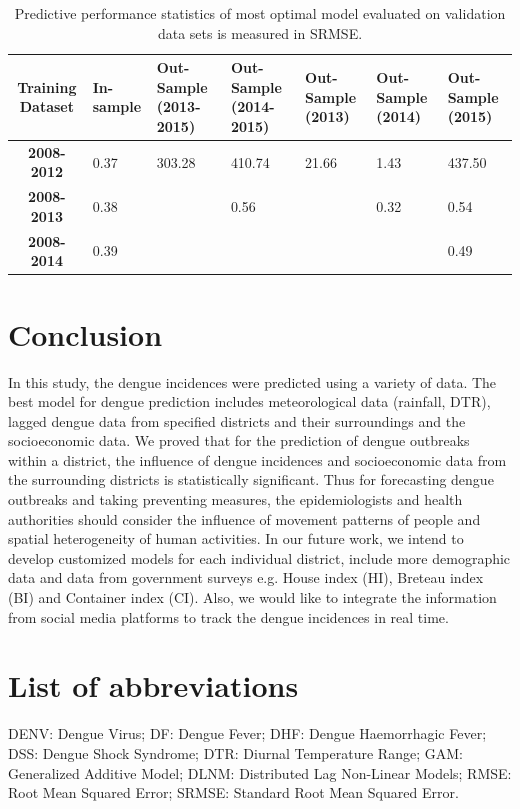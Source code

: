 \documentclass{bmcart}
\begin{document}
\begin{table}[H]
	\centering
	\begin{tabular}{|cp{1.5cm}p{1.5cm}p{1.5cm}p{1.5cm}p{1.5cm}p{1.5cm}|}
		\hline
		\textbf{Training Dataset} & \textbf{In-sample} & \textbf{Out-Sample} (2013-2015) & \textbf{Out-Sample} (2014-2015) & \textbf{Out-Sample} (2013) &\textbf{Out-Sample} (2014) & \textbf{Out-Sample} (2015) \\ 
		\hline
		\textbf{2008-2012} & 0.37 & 303.28 & 410.74 & 21.66 & 1.43 & 437.50 \\ 
		\textbf{2008-2013} & 0.38 &  & 0.56 &  & 0.32 & 0.54 \\ 
		\textbf{2008-2014} & 0.39 &  &  &  &  & 0.49 \\ 
		\hline
	\end{tabular}
	\caption{Predictive performance statistics of most optimal model evaluated on validation data sets is measured in SRMSE.}
	\label{tab:resultsOfValidation}
\end{table}




%
%


\section{Conclusion} \label{conclusion}


In this study, the dengue incidences were predicted using a variety of data. The best model for dengue prediction includes meteorological data (rainfall, DTR), lagged dengue data from specified districts and their surroundings and the socioeconomic data. We proved that for the prediction of dengue outbreaks within a district, the influence of dengue incidences and socioeconomic data from the surrounding districts is statistically significant. Thus for forecasting dengue outbreaks and taking preventing measures, the epidemiologists and health authorities should consider the influence of movement patterns of people and spatial heterogeneity of human activities. In our future work, we intend to develop customized models for each individual district, include more demographic data and data from government surveys e.g. House index (HI), Breteau index (BI) and Container index (CI). Also, we would like to integrate the information from social media platforms to track the dengue incidences in real time. 

\section*{List of abbreviations}
DENV: Dengue Virus; DF: Dengue Fever; DHF: Dengue Haemorrhagic Fever; DSS: Dengue Shock Syndrome; DTR: Diurnal Temperature Range; GAM: Generalized Additive Model; DLNM: Distributed Lag Non-Linear Models; RMSE: Root Mean Squared Error; SRMSE: Standard Root Mean Squared Error. 
\end{document}
